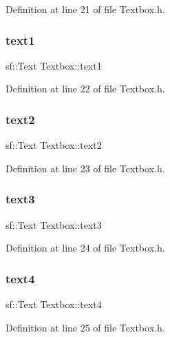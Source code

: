 Definition at line 21 of file Textbox.\+h.

\hypertarget{class_textbox_a5c229bd6795f3ab970ee0bf10252613d}{}\label{class_textbox_a5c229bd6795f3ab970ee0bf10252613d} 
\subsubsection{\texorpdfstring{text1}{text1}}
{\footnotesize\ttfamily sf\+::\+Text Textbox\+::text1}



Definition at line 22 of file Textbox.\+h.

\hypertarget{class_textbox_adafebfa39688753f259c72a7fcdcc3ad}{}\label{class_textbox_adafebfa39688753f259c72a7fcdcc3ad} 
\subsubsection{\texorpdfstring{text2}{text2}}
{\footnotesize\ttfamily sf\+::\+Text Textbox\+::text2}



Definition at line 23 of file Textbox.\+h.

\hypertarget{class_textbox_abccc498be23e0a6d7271a4692ae50289}{}\label{class_textbox_abccc498be23e0a6d7271a4692ae50289} 
\subsubsection{\texorpdfstring{text3}{text3}}
{\footnotesize\ttfamily sf\+::\+Text Textbox\+::text3}



Definition at line 24 of file Textbox.\+h.

\hypertarget{class_textbox_a37cfcc698bdbb5014fdc6ecf56c083c8}{}\label{class_textbox_a37cfcc698bdbb5014fdc6ecf56c083c8} 
\subsubsection{\texorpdfstring{text4}{text4}}
{\footnotesize\ttfamily sf\+::\+Text Textbox\+::text4}



Definition at line 25 of file Textbox.\+h.

\hypertarget{class_textbox_a4f9b578979f37d545571532e41148a45}{}\label{class_textbox_a4f9b578979f37d545571532e41148a45} 
